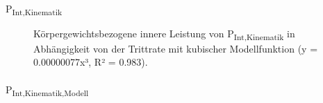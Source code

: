 \documentclass[
  letterpaper,
  DIV=11]{scrartcl}
\makeatletter
\let\oldparagraph\paragraph
\renewcommand{\paragraph}{
    \@ifstar
      \xxxParagraphStar
      \xxxParagraphNoStar
  }
\newcommand{\xxxParagraphStar}[1]{\oldparagraph*{#1}\mbox{}}
\newcommand{\xxxParagraphNoStar}[1]{\oldparagraph{#1}\mbox{}}
\makeatother
\begin{document}
\paragraph{\texorpdfstring{P\textsubscript{Int,Kinematik}}{PInt,Kinematik}}

\begin{figure}


\caption{\label{fig-PInt_Kin}Körpergewichtsbezogene innere Leistung von
P\textsubscript{Int,Kinematik} in Abhängigkeit von der Trittrate mit
kubischer Modellfunktion (y = 0.00000077x³, R² = 0.983).}

\end{figure}%

\paragraph{\texorpdfstring{P\textsubscript{Int,Kinematik,Modell}}{PInt,Kinematik,Modell}}
\end{document}
